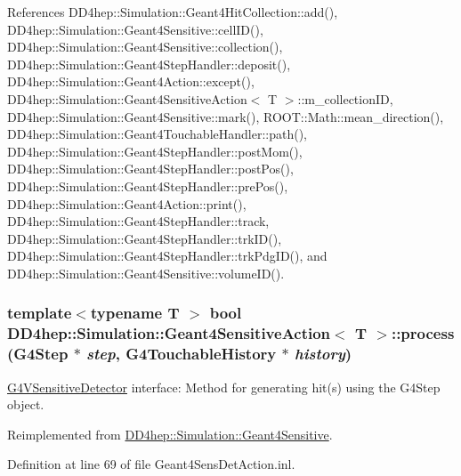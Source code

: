 References DD4hep::Simulation::Geant4HitCollection::add(), DD4hep::Simulation::Geant4Sensitive::cellID(), DD4hep::Simulation::Geant4Sensitive::collection(), DD4hep::Simulation::Geant4StepHandler::deposit(), DD4hep::Simulation::Geant4Action::except(), DD4hep::Simulation::Geant4SensitiveAction$<$ T $>$::m\_\-collectionID, DD4hep::Simulation::Geant4Sensitive::mark(), ROOT::Math::mean\_\-direction(), DD4hep::Simulation::Geant4TouchableHandler::path(), DD4hep::Simulation::Geant4StepHandler::postMom(), DD4hep::Simulation::Geant4StepHandler::postPos(), DD4hep::Simulation::Geant4StepHandler::prePos(), DD4hep::Simulation::Geant4Action::print(), DD4hep::Simulation::Geant4StepHandler::track, DD4hep::Simulation::Geant4StepHandler::trkID(), DD4hep::Simulation::Geant4StepHandler::trkPdgID(), and DD4hep::Simulation::Geant4Sensitive::volumeID().\hypertarget{class_d_d4hep_1_1_simulation_1_1_geant4_sensitive_action_a36759982ed0876a5ce81c14973c18077}{
\subsubsection[{process}]{\setlength{\rightskip}{0pt plus 5cm}template$<$typename T $>$ bool {\bf DD4hep::Simulation::Geant4SensitiveAction}$<$ T $>$::process (G4Step $\ast$ {\em step}, \/  G4TouchableHistory $\ast$ {\em history})}}
\label{class_d_d4hep_1_1_simulation_1_1_geant4_sensitive_action_a36759982ed0876a5ce81c14973c18077}


\hyperlink{class_g4_v_sensitive_detector}{G4VSensitiveDetector} interface: Method for generating hit(s) using the G4Step object. 

Reimplemented from \hyperlink{class_d_d4hep_1_1_simulation_1_1_geant4_sensitive_a9a9463a6c29a66dad43a52ffc9f7838d}{DD4hep::Simulation::Geant4Sensitive}.

Definition at line 69 of file Geant4SensDetAction.inl.

